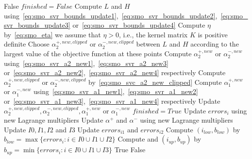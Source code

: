 \begin{breakablealgorithm}
	\newpage
	
	\begin{algorithmic}
				\State \Return False
			\EndIf
			\State $finished = False$
				\State Compute $L$ and $H$ using~\eqref{eq:smo_svr_bounds_update1},~\eqref{eq:smo_svr_bounds_update2},~\eqref{eq:smo_svr_bounds_update3} or~\eqref{eq:smo_svr_bounds_update4}
					\State Compute $\eta$ by~\eqref{eq:smo_eta} \Comment we assume that $\eta > 0$, i.e., the kernel matrix $K$ is positive definite
						\State Choose $\alpha_2^{+,new,clipped}$ or $\alpha_2^{-,new,clipped}$ between $L$ and $H$ according to the largest value of the objective function at these points
					\Else
						\State Compute $\alpha_2^{+,new}$ or $\alpha_2^{-,new}$ using~\eqref{eq:smo_svr_a2_new1},~\eqref{eq:smo_svr_a2_new3} or~\eqref{eq:smo_svr_a2_new2},~\eqref{eq:smo_svr_a2_new4} respectively
						\State Compute $\alpha_2^{+,new,clipped}$ or $\alpha_2^{-,new,clipped}$ by~\eqref{eq:smo_svc_a2_new_clipped}
					\EndIf
					\State Compute $\alpha_1^{+,new}$ or $\alpha_1^{-,new}$ using~\eqref{eq:smo_svr_a1_new1},~\eqref{eq:smo_svr_a1_new2} or~\eqref{eq:smo_svr_a1_new3},~\eqref{eq:smo_svr_a1_new4} respectively
						\State Update $\alpha_2^{+,new,clipped}, \alpha_2^{-,new,clipped}, \alpha_1^{+,new}$ or $\alpha_1^{-,new}$
					\EndIf
				\Else
					\State $finished = True$
				\EndIf
			\EndWhile
					\State Update $errors_i$ using new Lagrange multipliers
				\EndFor
				\State Update $\alpha^+$ and $\alpha^-$ using new Lagrange multipliers
				\State Update $I0, I1, I2$ and $I3$
				\State Update $errors_{i1}$ and $errors_{i2}$
					\State Compute $(i_{low}, b_{low})$ by $b_{low} = \max\{errors_i : i \in I0 \cup I1 \cup I2\}$
					\State Compute and $(i_{up}, b_{up})$ by $b_{up} = \min\{errors_i : i \in I0 \cup I1 \cup I3\}$
				\EndFor
				\State \Return True
			\Else
				\State \Return False
			\EndIf
		\EndFunction
	\end{algorithmic}
\end{breakablealgorithm}

